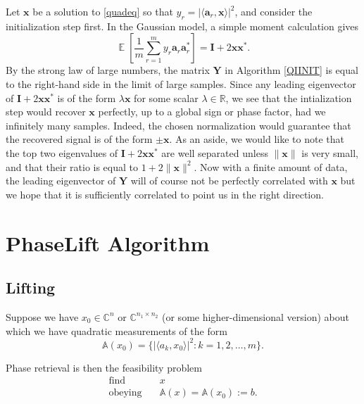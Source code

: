 \documentclass[conference,onecolumn,12pt]{IEEEtran}
\newcommand{\mapA}{\mathbb{A}}
\newcommand{\R}{\mathbb{R}}
\newcommand{\C}{\mathbb{C}}
\newcommand{\<}{\langle}
\renewcommand{\>}{\rangle}
\newcommand{\E}{\operatorname{\mathbb{E}}}
\newcommand{\vct}[1]{\bm{#1}}
\newcommand{\mtx}[1]{\bm{#1}}
\numberwithin{equation}{section}
\begin{document}
    Let $\vct{x}$ be a solution to \eqref{quadeq} so that $y_r = |\<
\vct{a}_r, \vct{x}\>|^2$, and consider the initialization step first.
In the Gaussian model, a simple moment calculation gives
\[
\E \left[\frac{1}{m}\sum_{r=1}^my_r\vct{a}_r\vct{a}_r^*\right] =
\mtx{I} + 2 \vct{x}\vct{x}^*. 
\]
By the strong law of large numbers, the matrix $\mtx{Y}$ in Algorithm
\ref{QIINIT} is equal to the right-hand side in the limit of large
samples. Since any leading eigenvector of $\mtx{I} + 2
\vct{x}\vct{x}^*$ is of the form $\lambda \vct{x}$ for some scalar
$\lambda \in \R$, we see that the intialization step would recover
$\vct{x}$ perfectly, up to a global sign or phase factor, had we
infinitely many samples. Indeed, the chosen normalization would
guarantee that the recovered signal is of the form $\pm \vct{x}$.  As
an aside, we would like to note that the top two eigenvalues of
$\mtx{I} + 2 \vct{x}\vct{x}^*$ are well separated unless $\|\vct{x}\|$
is very small, and that their ratio is equal to $1 + 2
\|\vct{x}\|^2$.  Now with a finite amount of data, the leading
eigenvector of $\mtx{Y}$ will of course not be perfectly correlated
with $\vct{x}$ but we hope that it is sufficiently correlated to point
us in the right direction.



\section{PhaseLift Algorithm}
\subsection{Lifting}
Suppose we have $x_0 \in \C^n$ or $\C^{n_1 \times n_2}$ (or some
higher-dimensional version) about which we have quadratic measurements
of the form
\begin{equation}
  \mapA(x_0) = \{|\<a_k, x_0\>|^2 : k = 1, 2, \ldots, m\}.
\label{nonlinearmap}
\end{equation}

Phase retrieval is then the feasibility problem
\begin{equation}
\label{eq:retrieval}
  \begin{array}{ll}
    \text{find}   & \quad x\\ 
\text{obeying} & \quad  \mapA(x) = \mapA(x_0) := b.
  \end{array}
\end{equation}
\end{document}
